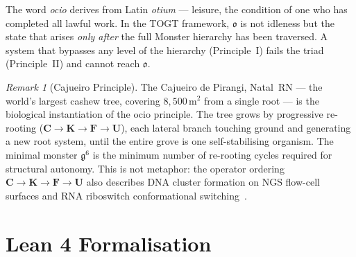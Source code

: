 \documentclass[12pt,a4paper]{amsart}
\theoremstyle{definition}
\theoremstyle{remark}
\newtheorem{remark}[theorem]{Remark}
\newcommand{\Cop}{\mathbf{C}}
\newcommand{\Kop}{\mathbf{K}}
\newcommand{\Fop}{\mathbf{F}}
\newcommand{\Uop}{\mathbf{U}}
\newcommand{\GG}{\mathfrak{g}}
\newcommand{\ocio}{\mathfrak{o}}
\begin{document}
\begin{center}
\end{center}

\medskip
The word \emph{ocio} derives from Latin \textit{otium} --- leisure, the condition of
one who has completed all lawful work. In the TOGT framework, $\ocio$ is not idleness
but the state that arises \emph{only after} the full Monster hierarchy has been traversed.
A system that bypasses any level of the hierarchy (Principle~I) fails the triad
(Principle~II) and cannot reach $\ocio$.

\begin{remark}[Cajueiro Principle]
The Cajueiro de Pirangi, Natal~RN --- the world's largest cashew tree, covering
$8{,}500\,\mathrm{m}^2$ from a single root --- is the biological instantiation of
the ocio principle. The tree grows by progressive re-rooting
($\Cop \to \Kop \to \Fop \to \Uop$), each lateral branch touching ground and
generating a new root system, until the entire grove is one self-stabilising organism.
The minimal monster $\GG^6$ is the minimum number of re-rooting cycles required
for structural autonomy. This is not metaphor: the operator ordering
$\Cop\to\Kop\to\Fop\to\Uop$ also describes DNA cluster formation on NGS flow-cell
surfaces and RNA riboswitch conformational switching~\cite{Grossi2026Bio}.
\end{remark}

\section{Lean 4 Formalisation}\label{sec:lean}
\end{document}
